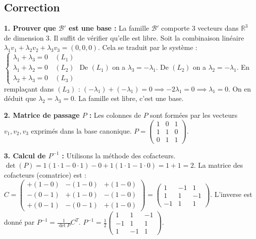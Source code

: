 \documentclass{report}
\begin{document}
\subsection*{Correction}
\textbf{1. Prouver que $\mathcal{B}'$ est une base :}
La famille $\mathcal{B}'$ comporte 3 vecteurs dans $\mathbb{R}^3$ de dimension 3. Il suffit de vérifier qu'elle est libre.
Soit la combinaison linéaire $\lambda_1 v_1 + \lambda_2 v_2 + \lambda_3 v_3 = (0,0,0)$.
Cela se traduit par le système :
$\begin{cases} \lambda_1 + \lambda_3 = 0 \quad (L_1)\\ \lambda_1 + \lambda_2 = 0 \quad (L_2)\\ \lambda_2 + \lambda_3 = 0 \quad (L_3) \end{cases}$
De $(L_1)$ on a $\lambda_3 = -\lambda_1$.
De $(L_2)$ on a $\lambda_2 = -\lambda_1$.
En remplaçant dans $(L_3)$ : $(-\lambda_1) + (-\lambda_1) = 0 \implies -2\lambda_1 = 0 \implies \lambda_1 = 0$.
On en déduit que $\lambda_2 = \lambda_3 = 0$. La famille est libre, c'est une base.

\textbf{2. Matrice de passage $P$ :}
Les colonnes de $P$ sont formées par les vecteurs $v_1, v_2, v_3$ exprimés dans la base canonique.
$P = \begin{pmatrix} 1 & 0 & 1 \\ 1 & 1 & 0 \\ 0 & 1 & 1 \end{pmatrix}$.

\textbf{3. Calcul de $P^{-1}$ :}
Utilisons la méthode des cofacteurs.
$\det(P) = 1(1 \cdot 1 - 0 \cdot 1) - 0 + 1(1 \cdot 1 - 1 \cdot 0) = 1 + 1 = 2$.
La matrice des cofacteurs (comatrice) est :
$C = \begin{pmatrix} +(1-0) & -(1-0) & +(1-0) \\ -(0-1) & +(1-0) & -(1-0) \\ +(0-1) & -(0-1) & +(1-0) \end{pmatrix} = \begin{pmatrix} 1 & -1 & 1 \\ 1 & 1 & -1 \\ -1 & 1 & 1 \end{pmatrix}$.
L'inverse est donné par $P^{-1} = \frac{1}{\det P} C^T$.
$P^{-1} = \frac{1}{2} \begin{pmatrix} 1 & 1 & -1 \\ -1 & 1 & 1 \\ 1 & -1 & 1 \end{pmatrix}$.
\end{document}
